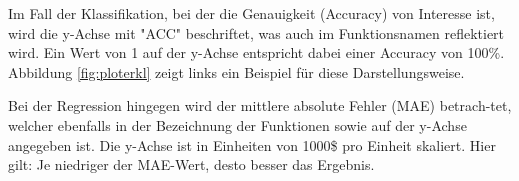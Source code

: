 Im Fall der Klassifikation, bei der die Genauigkeit (Accuracy) von Interesse ist, wird die y-Achse mit "ACC" beschriftet, was auch im 
Funktionsnamen reflektiert wird. Ein Wert von 1 auf der y-Achse entspricht dabei einer Accuracy von 100\%. Abbildung 
\ref{fig:ploterkl} zeigt links ein Beispiel für diese Darstellungsweise.

Bei der Regression hingegen wird der mittlere absolute Fehler (MAE) betrach-tet, welcher ebenfalls in der Bezeichnung der Funktionen sowie auf 
der y-Achse angegeben ist. Die y-Achse ist in Einheiten von 1000\$ pro Einheit skaliert. Hier gilt: Je niedriger der MAE-Wert, 
desto besser das Ergebnis.
